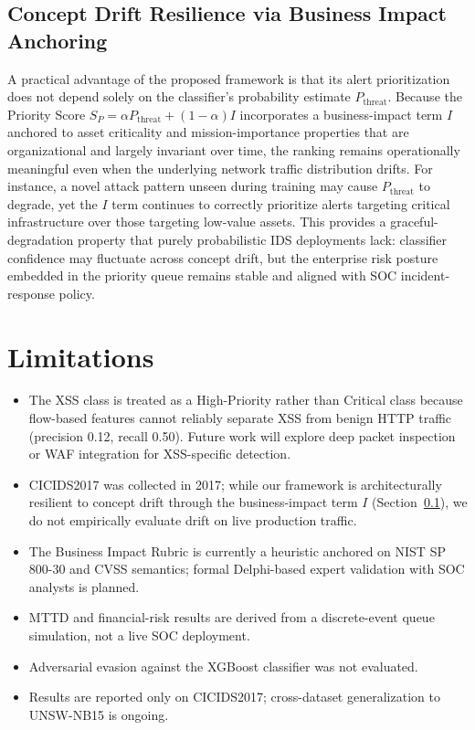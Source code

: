 \documentclass[conference]{IEEEtran}
\begin{document}
\subsection{Concept Drift Resilience via Business Impact Anchoring}
\label{subsec:concept_drift}

A practical advantage of the proposed framework is that its alert 
prioritization does not depend solely on the classifier's probability 
estimate $P_{\text{threat}}$. Because the Priority Score 
$S_P = \alpha P_{\text{threat}} + (1-\alpha) I$ incorporates a 
business-impact term $I$ anchored to asset criticality and 
mission-importance properties that are organizational and largely 
invariant over time, the ranking remains operationally meaningful 
even when the underlying network traffic distribution drifts. For 
instance, a novel attack pattern unseen during training may cause 
$P_{\text{threat}}$ to degrade, yet the $I$ term continues to 
correctly prioritize alerts targeting critical infrastructure over 
those targeting low-value assets. This provides a graceful-degradation 
property that purely probabilistic IDS deployments lack: classifier 
confidence may fluctuate across concept drift, but the enterprise 
risk posture embedded in the priority queue remains stable and 
aligned with SOC incident-response policy.

\section{Limitations}
\begin{itemize}
    \item The XSS class is treated as a High-Priority rather than 
Critical class because flow-based features cannot reliably separate 
XSS from benign HTTP traffic (precision 0.12, recall 0.50). Future 
work will explore deep packet inspection or WAF integration for 
XSS-specific detection.
    \item CICIDS2017 was collected in 2017; while our framework is architecturally resilient to concept drift through the business-impact term $I$ (Section~\ref{subsec:concept_drift}), we do not empirically evaluate drift on live production traffic.
    \item The Business Impact Rubric is currently a heuristic anchored on NIST SP 800-30 and CVSS semantics; formal Delphi-based expert validation with SOC analysts is planned.
    \item MTTD and financial-risk results are derived from a discrete-event queue simulation, not a live SOC deployment.
    \item Adversarial evasion against the XGBoost classifier was not evaluated.
    \item Results are reported only on CICIDS2017; cross-dataset generalization to UNSW-NB15 is ongoing.
\end{itemize}
\end{document}
